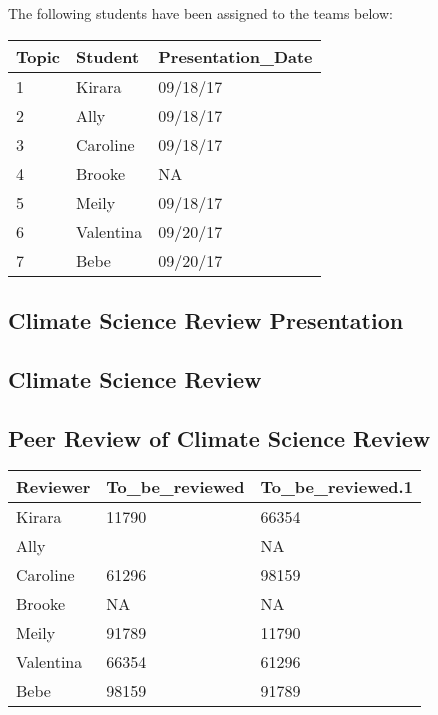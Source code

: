 \documentclass{article}\usepackage[]{graphicx}\usepackage[]{color}
\begin{document}
The following students have been assigned to the teams below:

\begin{table}[ht]
\centering
\begin{tabular}{lll}
  \hline
Topic & Student & Presentation\_Date \\ 
  \hline
1 & Kirara & 09/18/17 \\ 
  2 & Ally & 09/18/17 \\ 
  3 & Caroline & 09/18/17 \\ 
  4 & Brooke & NA \\ 
  5 & Meily & 09/18/17 \\ 
  6 & Valentina & 09/20/17 \\ 
  7 & Bebe & 09/20/17 \\ 
   \hline
\end{tabular}
\end{table}


\subsection{Climate Science Review Presentation}



\subsection{Climate Science Review}



\subsection{Peer Review of Climate Science Review}



\begin{table}[ht]
\centering
\begin{tabular}{lll}
  \hline
Reviewer & To\_be\_reviewed & To\_be\_reviewed.1 \\ 
  \hline
Kirara & 11790 & 66354 \\ 
  Ally &  & NA \\ 
  Caroline & 61296 & 98159 \\ 
  Brooke & NA & NA \\ 
  Meily & 91789 & 11790 \\ 
  Valentina & 66354 & 61296 \\ 
  Bebe & 98159 & 91789 \\ 
   \hline
\end{tabular}
\end{table}
\end{document}
